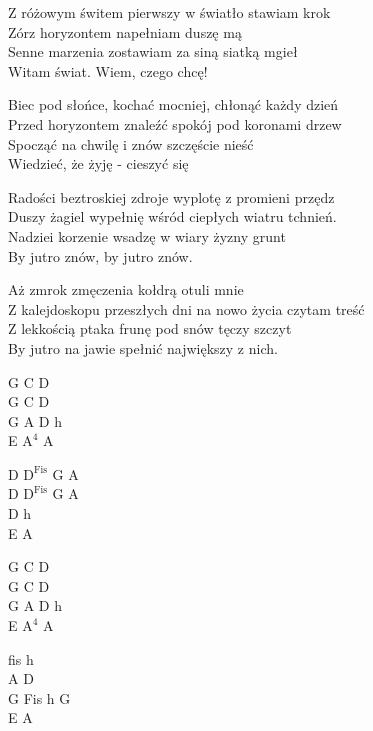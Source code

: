 \begin{text}
    \begin{smallTwo}
    Z różowym świtem pierwszy w światło stawiam krok\\
    Zórz horyzontem napełniam duszę mą\\
    Senne marzenia zostawiam za siną siatką mgieł\\
    Witam świat. Wiem, czego chcę!

    \vin Biec pod słońce, kochać mocniej, chłonąć każdy dzień\\
    \vin Przed horyzontem znaleźć spokój pod koronami drzew\\
    \vin Spocząć na chwilę i znów szczęście nieść\\
    \vin Wiedzieć, że żyję - cieszyć się

    Radości beztroskiej zdroje wyplotę z promieni przędz\\
    Duszy żagiel wypełnię wśród ciepłych wiatru tchnień.\\
    Nadziei korzenie wsadzę w wiary żyzny grunt\\
    By jutro znów, by jutro znów.

    Aż zmrok zmęczenia kołdrą otuli mnie\\
    Z kalejdoskopu przeszłych dni na nowo życia czytam treść\\
    Z lekkością ptaka frunę pod snów tęczy szczyt\\
    By jutro na jawie spełnić największy z nich.
    \end{smallTwo}
\end{text}
\begin{chord}
    \begin{smallTwo}
    G C D\\
    G C D\\
    G A D h\\
    E $\mathrm{A^{4}}$ A

    D $\mathrm{D^{Fis}}$ G A\\
    D $\mathrm{D^{Fis}}$ G A\\
    D h\\
    E A

    G C D\\
    G C D\\
    G A D h\\
    E $\mathrm{A^{4}}$ A

    fis h\\
    A D\\
    G Fis h G\\
    E A
    \end{smallTwo}
\end{chord}
